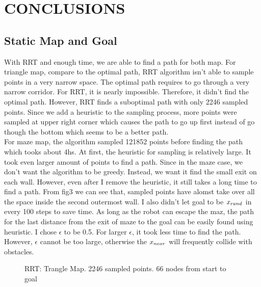 \documentclass[letterpaper, 10 pt, conference]{ieeeconf}  %
\begin{document}
\section{CONCLUSIONS}
\subsection{Static Map and Goal}
With RRT and enough time, we are able to find a path for both map. For triangle map, compare to the optimal path, RRT algorithm
isn't able to sample points in a very narrow space. The optimal path requires to go through a very narrow corridor. For RRT, it is 
nearly impossible. Therefore, it didn't find the optimal path. However, RRT finds a suboptimal path with only 2246
sampled points. Since we add a heuristic to the sampling process, more points were sampled at upper right corner which causes the
path to go up first instead of go though the bottom which seems to be a better path. \\

For maze map, the algorithm sampled 121852 points before finding the path which tooks about 4hs. At first, the heuristic for sampling
is relatively large. It took even larger amount of points to find a path. Since in the maze case, we don't want the algorithm to be 
greedy. Instead, we want it find the small exit on each wall. However, even after I remove the heuristic, it still takes a long time
to find a path. From fig3 we can see that, sampled points have alomst take over all the space inside the second outermost wall.
I also didn't let goal to be $x_{rand}$ in every 100 steps to save time. As long as the robot can escape the maz, the path for 
the last distance from the exit of maze to the goal can be easily found using heuristic. I chose $\epsilon$ to be 0.5. For 
larger $\epsilon$, it took less time to find the path. However, $\epsilon$ cannot be too large, otherwise the $x_{near}$ will frequently 
collide with obstacles. 

\begin{figure}[h]
    \centering
    \caption{RRT: Trangle Map. 2246 sampled points. 66 nodes from start to goal}
    \label{fig:map1}
 \end{figure}
\end{document}
